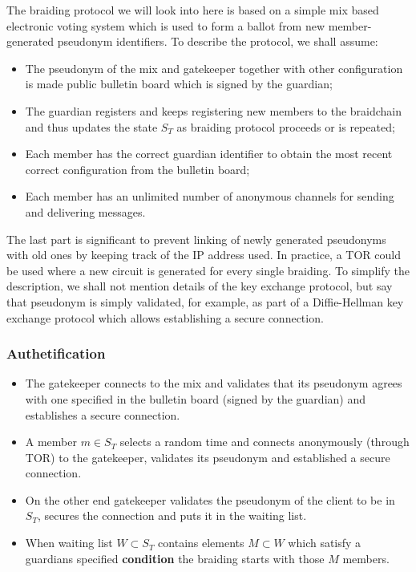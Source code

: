 \documentclass[12pt]{article}
\begin{document}
The braiding protocol we will look into here is based on a simple mix based electronic voting system which is used to form a ballot from new member-generated pseudonym identifiers. To describe the protocol, we shall assume:
\begin{itemize}
\item The pseudonym of the mix and gatekeeper together with other configuration is made public bulletin board which is signed by the guardian;
\item The guardian registers and keeps registering new members to the braidchain and thus updates the state $S_T$ as braiding protocol proceeds or is repeated;
\item Each member has the correct guardian identifier to obtain the most recent correct configuration from the bulletin board;
\item Each member has an unlimited number of anonymous channels for sending and delivering messages. 
\end{itemize}
The last part is significant to prevent linking of newly generated pseudonyms with old ones by keeping track of the IP address used. In practice, a TOR could be used where a new circuit is generated for every single braiding. To simplify the description, we shall not mention details of the key exchange protocol, but say that pseudonym is simply validated, for example, as part of a Diffie-Hellman key exchange protocol which allows establishing a secure connection.

\subsubsection*{Authetification}

\begin{itemize}
\item The gatekeeper connects to the mix and validates that its pseudonym agrees with one specified in the bulletin board (signed by the guardian) and establishes a secure connection. 
\item A member $m \in S_T$ selects a random time and connects anonymously (through TOR) to the gatekeeper, validates its pseudonym and established a secure connection.
\item On the other end gatekeeper validates the pseudonym of the client to be in $S_T$, secures the connection and puts it in the waiting list.
\item When waiting list $W \subset S_T$ contains elements $M \subset W$ which satisfy a guardians specified {\bf condition} the braiding starts with those $M$ members.
\end{itemize}
\end{document}
